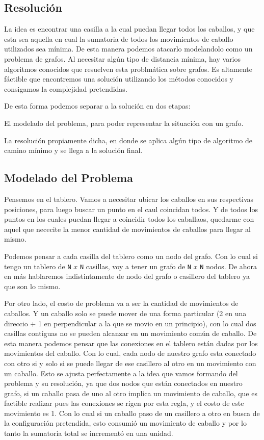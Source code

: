 \subsection{Resoluci\'on}

La idea es encontrar una casilla a la cual puedan llegar todos los caballos, y que esta sea aquella en cual la sumatoria de todos los movimientos de caballo utilizados sea m\'inima.
De esta manera podemos atacarlo modelandolo como un problema de grafos. Al necesitar alg\'un tipo de distancia m\'inima, hay varios algoritmos conocidos que resuelven esta problm\'atica sobre grafos. Es altamente f\'actible que encontremos una soluci\'on utilizando los m\'etodos conocidos y consigamos la complejidad pretendidas.

De esta forma podemos separar a la soluci\'on en dos etapas:
\begin{itemized}
	\item El modelado del problema, para poder representar la situaci\'on con un grafo.
	\item La resoluci\'on propiamente dicha, en donde se aplica alg\'un tipo de algoritmo de camino m\'inimo y se llega a la soluci\'on final.
\end{itemized}

\subsection{Modelado del Problema}

Pensemos en el tablero. Vamos a necesitar ubicar los caballos en sus respectivas posiciones, para luego buscar un punto en el caul coincidan todos. Y de todos los puntos en los cuales puedan llegar a coincidir todos los caballaos, quedarme con aquel que nececite la menor cantidad de movimientos de caballos para llegar al mismo.

Podemos pensar a cada casilla del tablero como un nodo del grafo. Con lo cual si tengo un tablero de \texttt{N} $x$ \texttt{N} casillas, voy a tener un grafo de \texttt{N} $x$ \texttt{N} nodos. De ahora en m\'as hablaremos indistintamente de nodo del grafo o casillero del tablero ya que son lo mismo.

Por otro lado, el costo de problema va a ser la cantidad de movimientos de caballos. Y un caballo solo se puede mover de una forma particular (2 en una direccio + 1 en perpendicular a la que se movio en un principio), con lo cual dos casillas contiguas no se pueden alcanzar en un movimiento com\'un de caballo.
De esta manera podemos pensar que las conexiones en el tablero est\'an dadas por los movimientos del caballo. Con lo cual, cada nodo de nuestro grafo esta conectado con otro si y solo si se puede llegar de ese casillero al otro en un movimiento con un caballo.
Esto se ajusta perfectamente a la idea que vamos formando del problema y su resoluci\'on, ya que dos nodos que est\'an conectados en nuestro grafo, si un caballo pasa de uno al otro implica un movimiento de caballo, que es factible realizar pues las conexiones se rigen por esta regla, y el costo de este movimiento es 1. Con lo cual si un caballo paso de un casillero a otro en busca de la configuraci\'on pretendida, esto consumi\'o un movimiento de caballo y por lo tanto la sumatoria total se increment\'o en una unidad.

